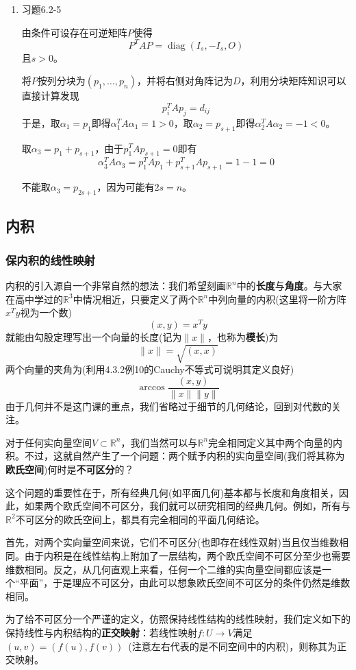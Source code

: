 \documentclass[a4paper,UTF8,fontset=windows]{ctexart}
\DeclareMathOperator{\diag}{diag}
\newcommand*{\note}{\noindent *}
\begin{document}
\begin{enumerate}
    \item 习题6.2-5
    
    由条件可设存在可逆矩阵$P$使得
    $$P^TAP=\diag(I_s,-I_s,O)$$
    且$s>0$。

    将$P$按列分块为$(p_1,\dots,p_n)$，并将右侧对角阵记为$D$，利用分块矩阵知识可以直接计算发现
    $$p_i^TAp_j=d_{ij}$$
    于是，取$\alpha_1=p_1$即得$\alpha_1^TA\alpha_1=1>0$，取$\alpha_2=p_{s+1}$即得$\alpha_2^TA\alpha_2=-1<0$。

    取$\alpha_3=p_1+p_{s+1}$，由于$p_1^TAp_{s+1}=0$即有
    $$\alpha_3^TA\alpha_3=p_1^TAp_1+p_{s+1}^TAp_{s+1}=1-1=0$$

    \note 不能取$\alpha_3=p_{2s+1}$，因为可能有$2s=n$。
\end{enumerate}
\subsection{内积}
\subsubsection{保内积的线性映射}
内积的引入源自一个非常自然的想法：我们希望刻画$\mathbb{R}^n$中的\textbf{长度}与\textbf{角度}。与大家在高中学过的$\mathbb{R}^3$中情况相近，只要定义了两个$\mathbb{R}^n$中列向量的内积(这里将一阶方阵$x^Ty$视为一个数)
$$(x,y)=x^Ty$$
就能由勾股定理写出一个向量的长度(记为$\|x\|$，也称为\textbf{模长})为
$$\|x\|=\sqrt{(x,x)}$$
两个向量的夹角为(利用4.3.2例10的Cauchy不等式可说明其定义良好)
$$\arccos\frac{(x,y)}{\|x\|\|y\|}$$
由于几何并不是这门课的重点，我们省略过于细节的几何结论，回到对代数的关注。

对于任何实向量空间$V\subset\mathbb{R}^n$，我们当然可以与$\mathbb{R}^n$完全相同定义其中两个向量的内积。不过，这就自然产生了一个问题：两个赋予内积的实向量空间(我们将其称为\textbf{欧氏空间})何时是\textbf{不可区分}的？

\note 这个问题的重要性在于，所有经典几何(如平面几何)基本都与长度和角度相关，因此，如果两个欧氏空间不可区分，我们就可以研究相同的经典几何。例如，所有与$\mathbb{R}^2$不可区分的欧氏空间上，都具有完全相同的平面几何结论。

首先，对两个实向量空间来说，它们不可区分(也即存在线性双射)当且仅当维数相同。由于内积是在线性结构上附加了一层结构，两个欧氏空间不可区分至少也需要维数相同。反之，从几何直观上来看，任何一个二维的实向量空间都应该是一个``平面''，于是理应不可区分，由此可以想象欧氏空间不可区分的条件仍然是维数相同。

为了给不可区分一个严谨的定义，仿照保持线性结构的线性映射，我们定义如下的保持线性与内积结构的\textbf{正交映射}：若线性映射$f:U\to V$满足$(u,v)=(f(u),f(v))$\ (注意左右代表的是不同空间中的内积)，则称其为正交映射。
\end{document}
